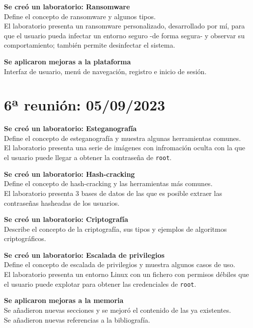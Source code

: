         \textbf{Se creó un laboratorio: Ransomware} \\
        Define el concepto de ransomware y algunos tipos. \\
        El laboratorio presenta un ransomware personalizado, desarrollado por mí, para que el usuario pueda infectar un entorno seguro -de forma segura- y observar su comportamiento; también permite desinfectar el sistema.

        \textbf{Se aplicaron mejoras a la plataforma} \\
        Interfaz de usuario, menú de navegación, registro e inicio de sesión.


    \section{6ª reunión: 05/09/2023}
        
        \textbf{Se creó un laboratorio: Esteganografía} \\
        Define el concepto de esteganografía y muestra algunas herramientas comunes. \\
        El laboratorio presenta una serie de imágenes con infromación oculta con la que el usuario puede llegar a obtener la contraseña de \texttt{root}.

        \textbf{Se creó un laboratorio: Hash-cracking} \\
        Define el concepto de hash-cracking y las herramientas más comunes. \\
        El laboratorio presenta 3 bases de datos de las que es posible extraer las contraseñas hasheadas de los usuarios.

        \textbf{Se creó un laboratorio: Criptografía} \\
        Describe el concepto de la criptografía, sus tipos y ejemplos de algoritmos criptográficos.

        \textbf{Se creó un laboratorio: Escalada de privilegios} \\
        Define el concepto de escalada de privilegios y muestra algunos casos de uso. \\
        El laboratorio presenta un entorno Linux con un fichero con permisos débiles que el usuario puede explotar para obtener las credenciales de \texttt{root}.

        \textbf{Se aplicaron mejoras a la memoria} \\
        Se añadieron nuevas secciones y se mejoró el contenido de las ya existentes. \\
        Se añadieron nuevas referencias a la bibliografía.


